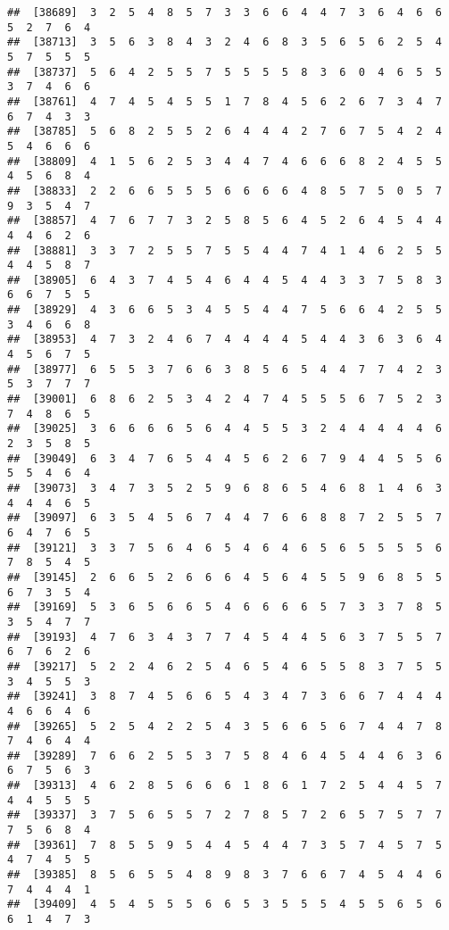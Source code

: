 \documentclass[
]{book}
\begin{document}
\begin{verbatim}
##  [38689]  3  2  5  4  8  5  7  3  3  6  6  4  4  7  3  6  4  6  6  5  2  7  6  4
##  [38713]  3  5  6  3  8  4  3  2  4  6  8  3  5  6  5  6  2  5  4  5  7  5  5  5
##  [38737]  5  6  4  2  5  5  7  5  5  5  5  8  3  6  0  4  6  5  5  3  7  4  6  6
##  [38761]  4  7  4  5  4  5  5  1  7  8  4  5  6  2  6  7  3  4  7  6  7  4  3  3
##  [38785]  5  6  8  2  5  5  2  6  4  4  4  2  7  6  7  5  4  2  4  5  4  6  6  6
##  [38809]  4  1  5  6  2  5  3  4  4  7  4  6  6  6  8  2  4  5  5  4  5  6  8  4
##  [38833]  2  2  6  6  5  5  5  6  6  6  6  4  8  5  7  5  0  5  7  9  3  5  4  7
##  [38857]  4  7  6  7  7  3  2  5  8  5  6  4  5  2  6  4  5  4  4  4  4  6  2  6
##  [38881]  3  3  7  2  5  5  7  5  5  4  4  7  4  1  4  6  2  5  5  4  4  5  8  7
##  [38905]  6  4  3  7  4  5  4  6  4  4  5  4  4  3  3  7  5  8  3  6  6  7  5  5
##  [38929]  4  3  6  6  5  3  4  5  5  4  4  7  5  6  6  4  2  5  5  3  4  6  6  8
##  [38953]  4  7  3  2  4  6  7  4  4  4  4  5  4  4  3  6  3  6  4  4  5  6  7  5
##  [38977]  6  5  5  3  7  6  6  3  8  5  6  5  4  4  7  7  4  2  3  5  3  7  7  7
##  [39001]  6  8  6  2  5  3  4  2  4  7  4  5  5  5  6  7  5  2  3  7  4  8  6  5
##  [39025]  3  6  6  6  6  5  6  4  4  5  5  3  2  4  4  4  4  4  6  2  3  5  8  5
##  [39049]  6  3  4  7  6  5  4  4  5  6  2  6  7  9  4  4  5  5  6  5  5  4  6  4
##  [39073]  3  4  7  3  5  2  5  9  6  8  6  5  4  6  8  1  4  6  3  4  4  4  6  5
##  [39097]  6  3  5  4  5  6  7  4  4  7  6  6  8  8  7  2  5  5  7  6  4  7  6  5
##  [39121]  3  3  7  5  6  4  6  5  4  6  4  6  5  6  5  5  5  5  6  7  8  5  4  5
##  [39145]  2  6  6  5  2  6  6  6  4  5  6  4  5  5  9  6  8  5  5  6  7  3  5  4
##  [39169]  5  3  6  5  6  6  5  4  6  6  6  6  5  7  3  3  7  8  5  3  5  4  7  7
##  [39193]  4  7  6  3  4  3  7  7  4  5  4  4  5  6  3  7  5  5  7  6  7  6  2  6
##  [39217]  5  2  2  4  6  2  5  4  6  5  4  6  5  5  8  3  7  5  5  3  4  5  5  3
##  [39241]  3  8  7  4  5  6  6  5  4  3  4  7  3  6  6  7  4  4  4  4  6  6  4  6
##  [39265]  5  2  5  4  2  2  5  4  3  5  6  6  5  6  7  4  4  7  8  7  4  6  4  4
##  [39289]  7  6  6  2  5  5  3  7  5  8  4  6  4  5  4  4  6  3  6  6  7  5  6  3
##  [39313]  4  6  2  8  5  6  6  6  1  8  6  1  7  2  5  4  4  5  7  4  4  5  5  5
##  [39337]  3  7  5  6  5  5  7  2  7  8  5  7  2  6  5  7  5  7  7  7  5  6  8  4
##  [39361]  7  8  5  5  9  5  4  4  5  4  4  7  3  5  7  4  5  7  5  4  7  4  5  5
##  [39385]  8  5  6  5  5  4  8  9  8  3  7  6  6  7  4  5  4  4  6  7  4  4  4  1
##  [39409]  4  5  4  5  5  5  6  6  5  3  5  5  5  4  5  5  6  5  6  6  1  4  7  3

\end{verbatim}
\end{document}
